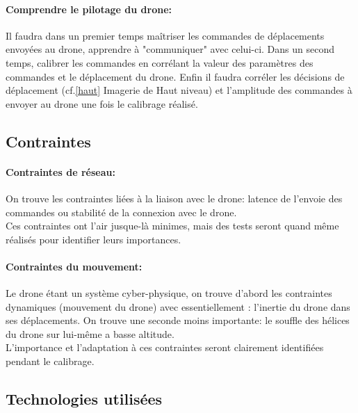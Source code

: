 \documentclass[12pt]{article}
\begin{document}
\paragraph*{Comprendre le pilotage du drone:}
Il faudra dans un premier temps maîtriser les commandes de déplacements envoyées au drone, apprendre à "communiquer" avec celui-ci.
Dans un second temps, calibrer les commandes en corrélant la valeur des paramètres des commandes et le déplacement du drone. Enfin il faudra corréler les décisions de déplacement (cf.\ref{haut} Imagerie de Haut niveau) et l'amplitude des commandes à envoyer au drone une fois le calibrage réalisé.


\subsection{Contraintes}

\paragraph*{Contraintes de réseau:}
 On trouve les contraintes liées à la liaison avec le drone: latence de l'envoie des commandes ou stabilité de la connexion avec le drone. \\
Ces contraintes ont l'air jusque-là minimes, mais des tests seront quand même réalisés pour identifier leurs importances.

\paragraph*{Contraintes du mouvement:}
Le drone étant un système cyber-physique, on trouve d'abord les contraintes dynamiques (mouvement du drone) avec essentiellement : l'inertie du drone dans ses déplacements. On trouve une seconde moins importante: le souffle des hélices du drone sur lui-même a basse altitude.\\
L'importance et l'adaptation à ces contraintes seront clairement identifiées pendant le calibrage.



\subsection{Technologies utilisées}
\end{document}
